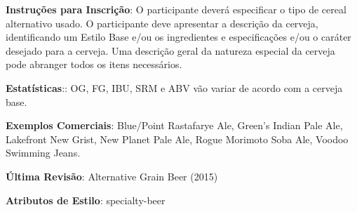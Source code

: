 \textbf{Instruções para Inscrição}: O participante deverá especificar o tipo de cereal alternativo usado. O participante deve apresentar a descrição da cerveja, identificando um Estilo Base e/ou os ingredientes e especificações e/ou o caráter desejado para a cerveja. Uma descrição geral da natureza especial da cerveja pode abranger todos os itens necessários.

\textbf{Estatísticas}:: OG, FG, IBU, SRM e ABV vão variar de acordo com a cerveja base.

\textbf{Exemplos Comerciais}: Blue/Point Rastafarye Ale, Green’s Indian Pale Ale, Lakefront New Grist, New Planet Pale Ale, Rogue Morimoto Soba Ale, Voodoo Swimming Jeans.

\textbf{Última Revisão}: Alternative Grain Beer (2015)

\textbf{Atributos de Estilo}: specialty-beer
